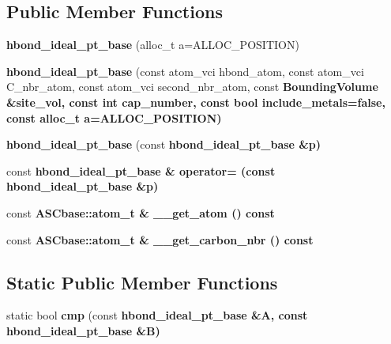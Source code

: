 \subsection*{Public Member Functions}
\begin{CompactItemize}
\item 
\textbf{hbond\_\-ideal\_\-pt\_\-base} (alloc\_\-t a=ALLOC\_\-POSITION)\label{classASCbase_1_1hbond__ideal__pt__base_6c727a2312275eeca47a7a36b27ff531}

\item 
\textbf{hbond\_\-ideal\_\-pt\_\-base} (const atom\_\-vci hbond\_\-atom, const atom\_\-vci C\_\-nbr\_\-atom, const atom\_\-vci second\_\-nbr\_\-atom, const \bf{Bounding\-Volume} \&site\_\-vol, const int cap\_\-number, const bool include\_\-metals=false, const alloc\_\-t a=ALLOC\_\-POSITION)\label{classASCbase_1_1hbond__ideal__pt__base_8c6aebede051225c5d7732dff3c9de61}

\item 
\textbf{hbond\_\-ideal\_\-pt\_\-base} (const \bf{hbond\_\-ideal\_\-pt\_\-base} \&p)\label{classASCbase_1_1hbond__ideal__pt__base_6b1afae556e880d14099bdca58304d46}

\item 
const \bf{hbond\_\-ideal\_\-pt\_\-base} \& \textbf{operator=} (const \bf{hbond\_\-ideal\_\-pt\_\-base} \&p)\label{classASCbase_1_1hbond__ideal__pt__base_a8a595d97addfd2dc71a74230a022dec}

\item 
const \bf{ASCbase::atom\_\-t} \& \textbf{\_\-\_\-get\_\-atom} () const \label{classASCbase_1_1hbond__ideal__pt__base_4ad13839630fecd1c9d561e081b7b18e}

\item 
const \bf{ASCbase::atom\_\-t} \& \textbf{\_\-\_\-get\_\-carbon\_\-nbr} () const \label{classASCbase_1_1hbond__ideal__pt__base_1e47efb94434d32735034ade4ee4a7fe}

\end{CompactItemize}
\subsection*{Static Public Member Functions}
\begin{CompactItemize}
\item 
static bool \textbf{cmp} (const \bf{hbond\_\-ideal\_\-pt\_\-base} \&A, const \bf{hbond\_\-ideal\_\-pt\_\-base} \&B)\label{classASCbase_1_1hbond__ideal__pt__base_6d6b4ad446addecc3079229713313731}

\end{CompactItemize}
